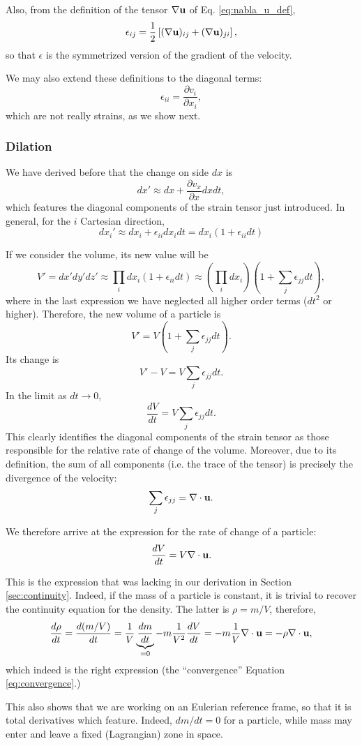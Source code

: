Also, from the definition of the tensor $\nabla \mathbf{u}$ of
Eq. \ref{eq:nabla_u_def},
\[
\epsilon_{ij} = \frac12
\left[
 (\nabla \mathbf{u})_{ij} +
 (\nabla \mathbf{u})_{ji}
\right] ,
\]
so that $\epsilon$ is the symmetrized version of the gradient of the
velocity.

We may also extend these definitions to the diagonal terms:
\[
  \epsilon_{ii} =   \frac{\partial v_i}{\partial x_i} ,
\]
which are not really strains, as we show next.

\subsubsection{Dilation}

We have derived before that the change on side $dx$ is
\[
dx' \approx  dx + \frac{\partial v_x}{\partial x} dx dt ,
\]
which features the diagonal components of the strain tensor just
introduced. In general, for the $i$ Cartesian direction,
\[
dx_i' \approx dx_i + \epsilon_{ii} dx_i dt = dx_i
\left(
1+\epsilon_{ii} dt
\right)
\]

If we consider the volume, its new value will be
\[
V'= dx' dy' dz'  \approx  \prod_i  dx_i \left( 1+\epsilon_{ii} dt \right)
\approx \left(\prod_i  dx_i \right) \left( 1 + \sum_j  \epsilon_{jj} dt \right) ,
\]
where in the last expression we have neglected all higher order terms
($dt^2$ or higher). Therefore, the new volume of a particle is
\[
V' = V \left( 1 + \sum_j  \epsilon_{jj} dt \right) .
\]
Its change is
\[
V'-V =  V \sum_j  \epsilon_{jj} dt .
\]
In the limit as $dt\to 0$,
\[
\frac{d V}{dt} = V \sum_j  \epsilon_{jj} dt .
\]
This clearly identifies the diagonal components of the strain tensor
as those responsible for the relative rate of change of the volume.
Moreover, due to its definition, the sum of all components (i.e. the
trace of the tensor) is precisely the divergence of the velocity:
\[
\sum_j  \epsilon_{jj} = \nabla\cdot \mathbf{u} .
\]

We therefore arrive at the expression for the rate of change of a particle:
\[
\frac{d V}{dt} = V  \nabla\cdot \mathbf{u} .
\]

This is the expression that was lacking in our derivation in
Section \ref{sec:continuity}. Indeed, if the mass of a particle is
constant, it is trivial to recover the continuity equation for the
density. The latter is $\rho=m/V$, therefore,
\[
\frac{d \rho }{dt} =
\frac{d (m/V) }{dt} = \frac1V \underbrace{\frac{ dm }{dt}}_{=0} -
m\frac1{V^2}  \frac{ dV }{dt } =
- m\frac1{V}  \nabla\cdot \mathbf{u}  = -\rho \nabla\cdot \mathbf{u} ,
\]
which indeed is the right expression (the ``convergence'' Equation
\ref{eq:convergence}.)

This also shows that we are working on an Eulerian reference frame, so
that it is total derivatives which feature. Indeed, $dm/dt=0$ for a
particle, while mass may enter and leave a fixed (Lagrangian) zone in
space.

